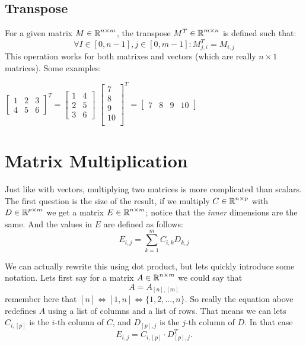 \subsection{Transpose} 
For a given matrix $M \in \operatorname{\mathbb{R}}^{n\times m}$, the transpose $M^T \in \operatorname{\mathbb{R}}^{m \times n}$ is defined such that:
\[
\forall I\in[0,n-1], j\in[0,m-1] : M^T_{j,i} = M_{i,j} 
\]
This operation works for both matrixes and vectors (which are really $n\times1$ matrices).
Some examples: 
\begin{center}
$\left[\begin{matrix}
1 & 2 & 3\\
4 & 5 & 6
\end{matrix}\right]^T = 
\left[\begin{matrix}
1 & 4 \\
2 & 5 \\
3 & 6
\end{matrix}\right]$%
\hspace{5em}
$\left[\begin{matrix}
7 \\
8 \\
9 \\
10 \\
\end{matrix}\right]^T = \left[\begin{matrix}
7 & 8 & 9 & 10
\end{matrix}\right]
$
\end{center}
\section{Matrix Multiplication}
Just like with vectors, multiplying two matrices is more complicated than scalars. 
The first question is the size of the result, if we multiply $C \in \operatorname{\mathbb{R}}^{n\times p}$ with $D \in \operatorname{\mathbb{R}}^{p\times m}$ we get a matrix $E \in \operatorname{\mathbb{R}}^{n\times m}$;
notice that the \textit{inner} dimensions are the same.
And the values in $E$ are defined as follows:
\[
E_{i,j} = \sum_{k=1}^m C_{i,k}D_{k,j}
\]

We can actually rewrite this using dot product, but lets quickly introduce some notation.
Lets first say for a matrix $A\in\operatorname{\mathbb{R}}^{n\times m}$ we could say that 
\[A = A_{[n],[m]}\] 
remember here that $[n] \iff [1,n] \iff \{1,2,...,n\}$. 
So really the equation above redefines $A$ using a list of columns and a list of rows. 
That means we can lets $C_{i,[p]}$ is the $i$-th column of $C$, and $D_{[p],j}$ is the $j$-th column of $D$.
In that case \[E_{i,j} = C_{i,[p]}\cdot D_{[p],j}^T.\]

